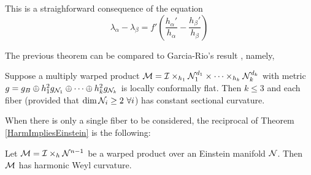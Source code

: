         \begin{demm}
            This is a straighforward consequence of the equation
            \[
        \lambda_{\alpha} - \lambda_{\beta} = f' \left(\frac{h_{\alpha}'}{h_{\alpha}}  - \frac{h_{\beta}'}{h_{\beta}} \right)
        \] 
        \end{demm}
        \begin{oobs}
            The previous theorem can be compared to Garcia-Rio's result , namely,

            \begin{teorema}
                Suppose a multiply warped product $\mathcal{M} = \mathcal{I} \times_{h_1} \mathcal{N}_1^{d_1} \times \cdots \times_{h_k} \mathcal{N}_{k}^{d_k}$ with metric $g = g_{B} \oplus h_1^2 g_{\mathcal{N}_1} \oplus \cdots \oplus h_{k}^2 g_{\mathcal{N}_k}$ is locally conformally flat. Then $k \leq 3$ and each fiber (provided that $\dim \mathcal{N}_i \geq 2 \ \forall i$) has constant sectional curvature.
            \end{teorema}
        \end{oobs}


        
        When there is only a single fiber to be considered, the reciprocal of Theorem \cref{HarmImpliesEinstein} is the following:
        
        \begin{teorema}\label{harmWarp}
            Let $\mathcal{M} = \mathcal{I} \times_{h} \mathcal{N}^{n-1}$ be a warped product over an Einstein manifold $\mathcal{N}$. Then $\mathcal{M}$ has harmonic Weyl curvature.
        \end{teorema}
        

